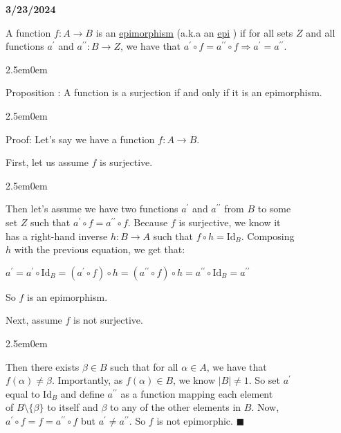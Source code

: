 \documentclass{book}
\newcommand{\hOne}{%
   \color{Black}%
   \fontsize{14}{16}\selectfont%
}
\newcommand{\hTwo}{%
   \color{MidnightBlue}%
   \fontsize{13}{15}\selectfont%
}
\newcommand{\hThree}{%
   \color{PineGreen!85!Orange}
   \fontsize{13}{15}\selectfont%
}
\newenvironment{myIndent}{%
   \begin{adjustwidth}{2.5em}{0em}%
}{%
   \end{adjustwidth}%
}
\newcommand{\udefine}[1]{{%
   \setulcolor{Red}%
   \setul{0.14em}{0.07em}%
   \ul{#1}%
}}
\newcommand*{\markDate}[1]{%
   {\huge \color{Black} \textbf{#1} \newline}%
}
\newcommand{\pprime}{{\prime\prime}}
\newcommand{\myId}{\mathrm{Id}}
\newcounter{PropNumber}
\newcommand{\propCount}{%
   \stepcounter{PropNumber}%
   \thePropNumber%
}
\newcommand{\retTwo}{\hfill\bigbreak}
\begin{document}
   \markDate{3/23/2024}

   \hOne
   A function $f: A \rightarrow B$ is an \udefine{epimorphism} 
   (a.k.a an \udefine{epi}) if for all sets $Z$ and all\\ functions $a^{\prime}$
   and $a^{\pprime}: B \rightarrow Z$, we have that 
   $a^{\prime} \circ f = a^{\pprime} \circ f \Rightarrow 
   a^{\prime} = a^{\pprime}$.

   
   \begin{myIndent}
      \hTwo
      Proposition \propCount: A function is a surjection if and
      only if it is an epimorphism.
      
      \hThree
      \begin{myIndent}
         Proof: Let's say we have a function $f: A \rightarrow B$.
         \hfill \bigbreak

         First, let us assume $f$ is surjective.
         \begin{myIndent}
               Then let's assume we have two functions $a^\prime$ and $a^\pprime$ from $B$ to some\\ set $Z$ such that $a^\prime \circ f = a^\pprime \circ f$. Because $f$ is surjective, we know it\\ has a right-hand inverse $h: B \rightarrow A$ such that $f \circ h = \myId_B$. Composing\\ $h$ with the previous equation, we get that:

               {\center $a^{\prime} = a^{\prime} \circ \myId_B = (a^\prime \circ f) \circ h = (a^\pprime \circ f) \circ h = a^\pprime \circ \myId_B = a^\pprime$\retTwo\par}

               So $f$ is an epimorphism.\retTwo
         \end{myIndent}

         Next, assume $f$ is not surjective.
         \begin{myIndent}
            Then there exists $\beta \in B$ such that for all $\alpha \in A$, we have that\\ $f(\alpha) \neq \beta$. Importantly, as $f(\alpha) \in B$, we know $|B| \neq 1$. So set $a^\prime$\\ equal to $\myId_B$ and define $a^\pprime$ as a function mapping each element\\ of $B \setminus \{\beta \}$ to itself and $\beta$ to any of the other elements in $B$. Now,\\
            $a^\prime \circ f = f = a^\pprime \circ f$ but $a^\prime \neq a^\pprime$. So $f$ is not epimorphic. $\blacksquare$\retTwo
         \end{myIndent}
      \end{myIndent}
   \end{myIndent}
\end{document}
